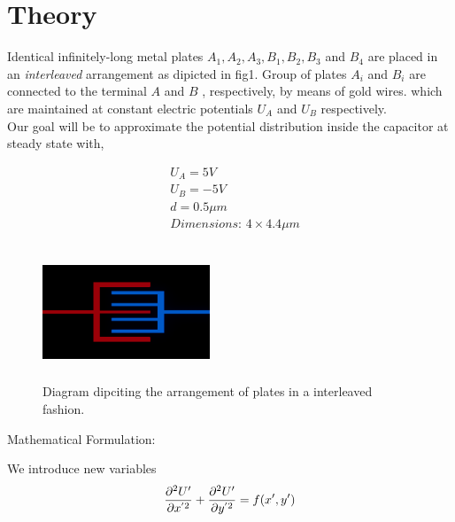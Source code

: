\section{Theory}
Identical infinitely-long metal plates $A_1,A_2,A_3,B_1,B_2,B_3 $ and $B_4$ are placed in an \textit{interleaved} arrangement as dipicted in fig1. Group of plates $A_i$ and $B_i$ are connected to the terminal $A$ and $B$ , respectively, by means of gold wires. which are maintained at constant electric potentials $U_A$ and $U_B$ respectively. \\
Our goal will be to approximate the potential distribution inside the capacitor at steady state with,

\begin{align*}
    &U_A = 5V \\
    &U_B = -5V \\
    &d = 0.5\mu m \\
    &\textit{Dimensions: } 4 \times 4.4 \mu m  
\end{align*}
\begin{figure}[h]
    \centering
    \includegraphics[width=5cm, height=4cm]{content/interleaved_cap_2D.png}
    \caption{\small Diagram dipciting the arrangement of plates in a interleaved fashion.}
    \label{fig 1: the capacitor}
\end{figure}
Mathematical Formulation:

We introduce new variables 
\begin{equation}
    \frac{\partial^2U' }{\partial x^{'2}} + \frac{\partial^2U' }{\partial y^{'2}}= f(x',y') \\
\end{equation}